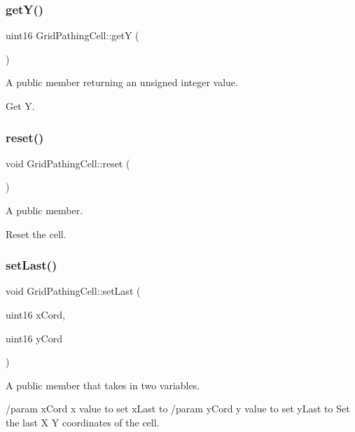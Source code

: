 \subsubsection{\texorpdfstring{get\+Y()}{getY()}}
{\footnotesize\ttfamily uint16 Grid\+Pathing\+Cell\+::getY (\begin{DoxyParamCaption}{ }\end{DoxyParamCaption})}



A public member returning an unsigned integer value. 

Get Y. \hypertarget{class_grid_pathing_cell_ae706bf7d75f31d2a00d5e6de28da635c}{}\label{class_grid_pathing_cell_ae706bf7d75f31d2a00d5e6de28da635c} 
\subsubsection{\texorpdfstring{reset()}{reset()}}
{\footnotesize\ttfamily void Grid\+Pathing\+Cell\+::reset (\begin{DoxyParamCaption}{ }\end{DoxyParamCaption})}



A public member. 

Reset the cell. \hypertarget{class_grid_pathing_cell_a6d360533681a9fc827b0b01c12f9fbf1}{}\label{class_grid_pathing_cell_a6d360533681a9fc827b0b01c12f9fbf1} 
\subsubsection{\texorpdfstring{set\+Last()}{setLast()}}
{\footnotesize\ttfamily void Grid\+Pathing\+Cell\+::set\+Last (\begin{DoxyParamCaption}\item[{uint16}]{x\+Cord,  }\item[{uint16}]{y\+Cord }\end{DoxyParamCaption})}



A public member that takes in two variables. 

/param x\+Cord x value to set x\+Last to /param y\+Cord y value to set y\+Last to Set the last X Y coordinates of the cell. \hypertarget{class_grid_pathing_cell_a7e0b53ba48d7aa0576147759836b933a}{}\label{class_grid_pathing_cell_a7e0b53ba48d7aa0576147759836b933a} 
